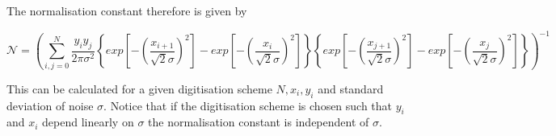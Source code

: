 \documentclass[apj]{emulateapj}
\begin{document}
The normalisation constant therefore is given by

\begin{equation}
\mathcal{N} = \left( \sum_{i,j=0}^N \frac{y_i y_j}{2\pi\sigma^2} \left\{ exp \left[ - \left(\frac{x_{i+1}}{\sqrt{2}\sigma} \right)^2 \right] - exp \left[ - \left(\frac{x_{i}}{\sqrt{2}\sigma} \right)^2 \right] \right\} \left\{ exp \left[ - \left(\frac{x_{j+1}}{\sqrt{2}\sigma} \right)^2 \right] - exp \left[ - \left(\frac{x_{j}}{\sqrt{2}\sigma} \right)^2 \right] \right\} \right)^{-1}
\end{equation}

This can be calculated for a given digitisation scheme $N, x_i, y_i$ and standard deviation of noise $\sigma$. Notice that if the digitisation scheme is chosen such that $y_i$ and $x_i$ depend linearly on $\sigma$ the normalisation constant is independent of $\sigma$.

\newpage


\end{document}
